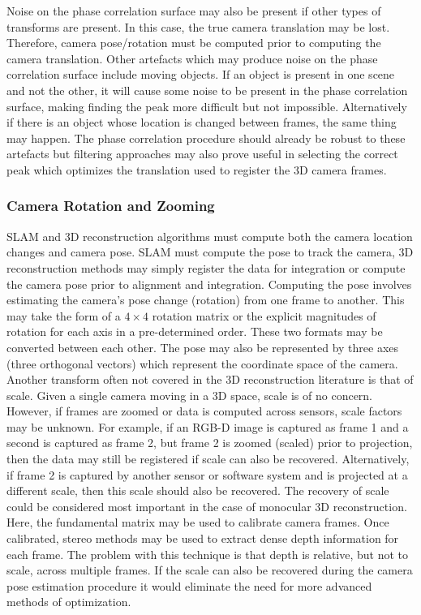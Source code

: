 Noise on the phase correlation surface may also be present if other types of transforms are present. In this case, the true camera translation may be lost. Therefore, camera pose/rotation must be computed prior to computing the camera translation. Other artefacts which may produce noise on the phase correlation surface include moving objects. If an object is present in one scene and not the other, it will cause some noise to be present in the phase correlation surface, making finding the peak more difficult but not impossible. Alternatively if there is an object whose location is changed between frames, the same thing may happen. The phase correlation procedure should already be robust to these artefacts but filtering approaches may also prove useful in selecting the correct peak which optimizes the translation used to register the 3D camera frames. \\

\subsubsection{Camera Rotation and Zooming}
\label{Sec:RoteZoomingSection}

SLAM and 3D reconstruction algorithms must compute both the camera location changes and camera pose. SLAM must compute the pose to track the camera, 3D reconstruction methods may simply register the data for integration or compute the camera pose prior to alignment and integration. Computing the pose involves estimating the camera's pose change (rotation) from one frame to another. This may take the form of a $4 \times 4$ rotation matrix or the explicit magnitudes of rotation for each axis in a pre-determined order. These two formats may be converted between each other. The pose may also be represented by three axes (three orthogonal vectors) which represent the coordinate space of the camera. \\

Another transform often not covered in the 3D reconstruction literature is that of scale. Given a single camera moving in a 3D space, scale is of no concern. However, if frames are zoomed or data is computed across sensors, scale factors may be unknown. For example, if an RGB-D image is captured as frame 1 and a second is captured as frame 2, but frame 2 is zoomed (scaled) prior to projection, then the data may still be registered if scale can also be recovered. Alternatively, if frame 2 is captured by another sensor or software system and is projected at a different scale, then this scale should also be recovered. The recovery of scale could be considered most important in the case of monocular 3D reconstruction. Here, the fundamental matrix may be used to calibrate camera frames. Once calibrated, stereo methods may be used to extract dense depth information for each frame. The problem with this technique is that depth is relative, but not to scale, across multiple frames. If the scale can also be recovered during the camera pose estimation procedure it would eliminate the need for more advanced methods of optimization. \\ 

